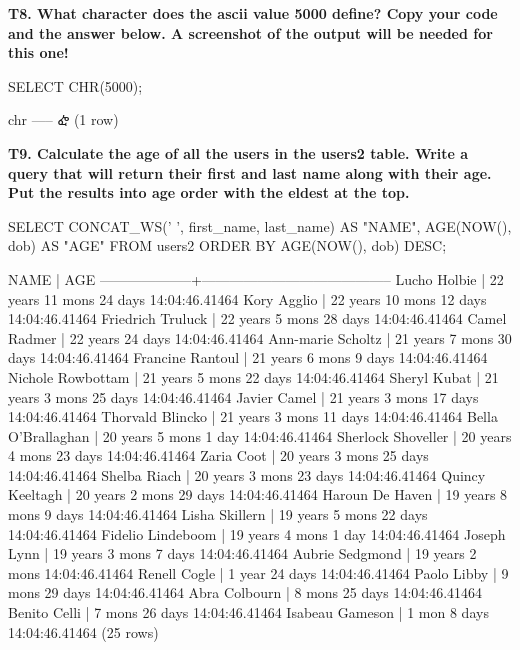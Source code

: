 \textbf{T8. What character does the ascii value 5000 define? Copy your code and the answer below. A screenshot of the output will be needed for this one!}
\begin{sql}
SELECT CHR(5000);
\end{sql}
\begin{pseudo}
 chr
-----
 ᎈ
(1 row)
\end{pseudo}

\textbf{T9. Calculate the age of all the users in the users2 table. Write a query that will return their first and last name along with their age. Put the results into age order with the eldest at the top.}
\begin{sql}
SELECT CONCAT_WS(' ', first_name, last_name) AS "NAME", AGE(NOW(), dob) AS "AGE"
FROM users2
ORDER BY AGE(NOW(), dob) DESC;
\end{sql}
\begin{pseudo}
        NAME        |                   AGE
--------------------+-----------------------------------------
 Lucho Holbie       | 22 years 11 mons 24 days 14:04:46.41464
 Kory Agglio        | 22 years 10 mons 12 days 14:04:46.41464
 Friedrich Truluck  | 22 years 5 mons 28 days 14:04:46.41464
 Camel Radmer       | 22 years 24 days 14:04:46.41464
 Ann-marie Scholtz  | 21 years 7 mons 30 days 14:04:46.41464
 Francine Rantoul   | 21 years 6 mons 9 days 14:04:46.41464
 Nichole Rowbottam  | 21 years 5 mons 22 days 14:04:46.41464
 Sheryl Kubat       | 21 years 3 mons 25 days 14:04:46.41464
 Javier Camel       | 21 years 3 mons 17 days 14:04:46.41464
 Thorvald Blincko   | 21 years 3 mons 11 days 14:04:46.41464
 Bella O'Brallaghan | 20 years 5 mons 1 day 14:04:46.41464
 Sherlock Shoveller | 20 years 4 mons 23 days 14:04:46.41464
 Zaria Coot         | 20 years 3 mons 25 days 14:04:46.41464
 Shelba Riach       | 20 years 3 mons 23 days 14:04:46.41464
 Quincy Keeltagh    | 20 years 2 mons 29 days 14:04:46.41464
 Haroun De Haven    | 19 years 8 mons 9 days 14:04:46.41464
 Lisha Skillern     | 19 years 5 mons 22 days 14:04:46.41464
 Fidelio Lindeboom  | 19 years 4 mons 1 day 14:04:46.41464
 Joseph Lynn        | 19 years 3 mons 7 days 14:04:46.41464
 Aubrie Sedgmond    | 19 years 2 mons 14:04:46.41464
 Renell Cogle       | 1 year 24 days 14:04:46.41464
 Paolo Libby        | 9 mons 29 days 14:04:46.41464
 Abra Colbourn      | 8 mons 25 days 14:04:46.41464
 Benito Celli       | 7 mons 26 days 14:04:46.41464
 Isabeau Gameson    | 1 mon 8 days 14:04:46.41464
(25 rows)
\end{pseudo}

